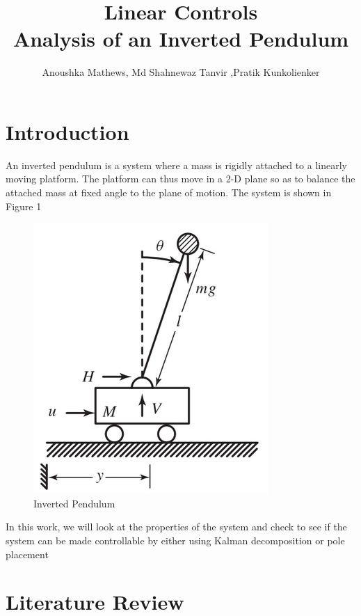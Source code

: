 \documentclass[11pt]{article}
\title{Linear Controls \\ Analysis of an Inverted Pendulum}
\author{Anoushka Mathews, Md Shahnewaz Tanvir ,Pratik Kunkolienker}
\begin{document}
    
    \maketitle
    \newpage
    \tableofcontents
    \newpage
    
    

    
\section{Introduction}\label{introduction}

An inverted pendulum is a system where a mass is rigidly attached to a
linearly moving platform. The platform can thus move in a 2-D plane so
as to balance the attached mass at fixed angle to the plane of motion.
The system is shown in Figure 1

\begin{figure}
\centering
\includegraphics{./Figures/InvertedPendulum.png}
\caption{Inverted Pendulum}
\end{figure}

In this work, we will look at the properties of the system and check to
see if the system can be made controllable by either using Kalman
decomposition or pole placement

\section{Literature Review}\label{literature-review}
\end{document}
